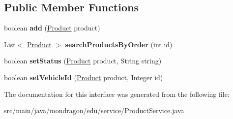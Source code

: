 \subsection*{Public Member Functions}
\begin{DoxyCompactItemize}
\item 
\mbox{\label{interfacemondragon_1_1edu_1_1service_1_1_product_service_ab017919cc99a6fd57cca14e1264126b4}} 
boolean {\bfseries add} (\mbox{\hyperlink{classmondragon_1_1edu_1_1clases_1_1_product}{Product}} product)
\item 
\mbox{\label{interfacemondragon_1_1edu_1_1service_1_1_product_service_ad1d44f6cf6be1c86f990d54840f2f009}} 
List$<$ \mbox{\hyperlink{classmondragon_1_1edu_1_1clases_1_1_product}{Product}} $>$ {\bfseries search\+Products\+By\+Order} (int id)
\item 
\mbox{\label{interfacemondragon_1_1edu_1_1service_1_1_product_service_abceb79bbf3506d4bc0caeadbf84d44d5}} 
boolean {\bfseries set\+Status} (\mbox{\hyperlink{classmondragon_1_1edu_1_1clases_1_1_product}{Product}} product, String string)
\item 
\mbox{\label{interfacemondragon_1_1edu_1_1service_1_1_product_service_af43e2121b8909f987f3a8850daba6edc}} 
boolean {\bfseries set\+Vehicle\+Id} (\mbox{\hyperlink{classmondragon_1_1edu_1_1clases_1_1_product}{Product}} product, Integer id)
\end{DoxyCompactItemize}


The documentation for this interface was generated from the following file\+:\begin{DoxyCompactItemize}
\item 
src/main/java/mondragon/edu/service/Product\+Service.\+java\end{DoxyCompactItemize}
